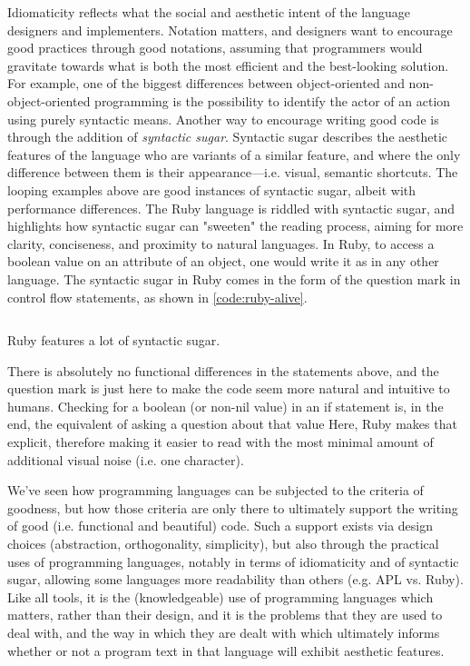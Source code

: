 Idiomaticity reflects what the social and aesthetic intent of the language designers and implementers. Notation matters, and designers want to encourage good practices through good notations, assuming that programmers would gravitate towards what is both the most efficient and the best-looking solution. For example, one of the biggest differences between object-oriented and non-object-oriented programming is the possibility to identify the actor of an action using purely syntactic means\citep{sustrik_250bpm_2021}. Another way to encourage writing good code is through the addition of \emph{syntactic sugar}. Syntactic sugar describes the aesthetic features of the language who are variants of a similar feature, and where the only difference between them is their appearance—i.e. visual, semantic shortcuts. The looping examples above are good instances of syntactic sugar, albeit with performance differences. The Ruby language is riddled with syntactic sugar, and highlights how syntactic sugar can "sweeten" the reading process, aiming for more clarity, conciseness, and proximity to natural languages. In Ruby, to access a boolean value on an attribute of an object, one would write it as in any other language. The syntactic sugar in Ruby comes in the form of the question mark in control flow statements, as shown in \ref{code:ruby-alive}.

\begin{listing}
  \inputminted{python}{./corpus/alive.rb}
  \caption{Ruby features a lot of syntactic sugar.}
  \label{code:ruby-alive}
\end{listing}

There is absolutely no functional differences in the statements above, and the question mark is just here to make the code seem more natural and intuitive to humans. Checking for a boolean (or non-nil value) in an if statement is, in the end, the equivalent of asking a question about that value Here, Ruby makes that explicit, therefore making it easier to read with the most minimal amount of additional visual noise (i.e. one character).

We've seen how programming languages can be subjected to the criteria of goodness, but how those criteria are only there to ultimately support the writing of good (i.e. functional and beautiful) code. Such a support exists via design choices (abstraction, orthogonality, simplicity), but also through the practical uses of programming languages, notably in terms of idiomaticity and of syntactic sugar, allowing some languages more readability than others (e.g. APL vs. Ruby). Like all tools, it is the (knowledgeable) use of programming languages which matters, rather than their design, and it is the problems that they are used to deal with, and the way in which they are dealt with which ultimately informs whether or not a program text in that language will exhibit aesthetic features.

